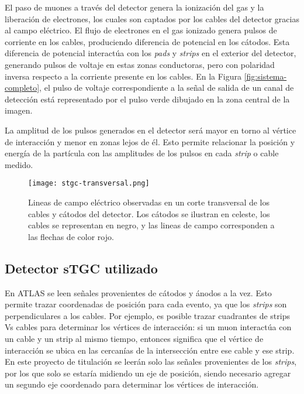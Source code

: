 	El paso de muones a través del detector genera la ionización del gas y la liberación de electrones, los cuales son captados por los cables del detector gracias al campo eléctrico. El flujo de electrones en el gas ionizado genera pulsos de corriente en los cables, produciendo diferencia de potencial en los cátodos. Esta diferencia de potencial interactúa con los \textit{pads} y \textit{strips} en el exterior del detector, generando pulsos de voltaje en estas zonas conductoras, pero con polaridad inversa respecto a la corriente presente en los cables. En la Figura \ref{fig:sistema-completo}, el pulso de voltaje correspondiente a la señal de salida de un canal de detección está representado por el pulso verde dibujado en la zona central de la imagen.
	
	La amplitud de los pulsos generados en el detector será mayor en torno al vértice de interacción y menor en zonas lejos de él. Esto permite relacionar la posición y energía de la partícula con las amplitudes de los pulsos en cada \textit{strip} o cable medido.
	
	\begin{figure}[h]
		\centering
		\texttt{[image: stgc-transversal.png]}
		\caption{Lineas de campo eléctrico observadas en un corte transversal de los cables y cátodos del detector. Los cátodos se ilustran en celeste, los cables se representan en negro, y las lineas de campo corresponden a las flechas de color rojo\cite{DeSmet2011StudyLab}.}
		\label{img:stgc-field}
	\end{figure}

\subsection{Detector sTGC utilizado}
	En ATLAS se leen señales provenientes de cátodos y ánodos a la vez. Esto permite trazar coordenadas de posición para cada evento, ya que los \textit{strips} son perpendiculares a los cables. Por ejemplo, es posible trazar cuadrantes de strips Vs cables  para determinar los vértices de interacción: si un muon interactúa con un cable y un strip al mismo tiempo, entonces significa que el vértice de interacción se ubica en las cercanías de la intersección entre ese cable y ese strip. En este proyecto de titulación se leerán solo las señales provenientes de los \textit{strips}, por los que solo se estaría midiendo un eje de posición, siendo necesario agregar un segundo eje coordenado para determinar los vértices de interacción.
	
